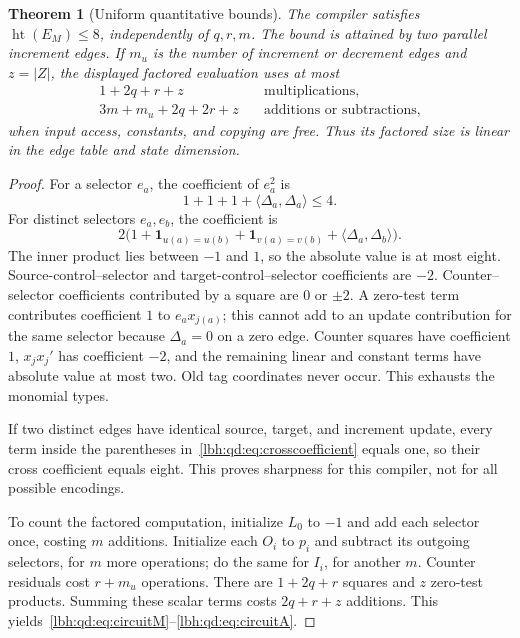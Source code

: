 \documentclass[11pt,letterpaper]{article}
\newtheorem{theorem}{Theorem}[section]
\theoremstyle{definition}
\theoremstyle{remark}
\newcommand{\one}{\mathbf 1}
\DeclareMathOperator{\htp}{ht}%
\newcommand{\1}{\mathbf 1}
\begin{document}
\begin{theorem}[Uniform quantitative bounds]\label{lbh:qd:thm:height}
The compiler satisfies $\htp(E_M)\leq8$, independently of $q,r,m$. The bound
is attained by two parallel increment edges. If $m_u$ is the number of
increment or decrement edges and $z=|Z|$, the displayed factored evaluation
uses at most
\begin{align}
 1+2q+r+z&\quad\text{multiplications},\label{lbh:qd:eq:circuitM}\\
 3m+m_u+2q+2r+z&\quad\text{additions or subtractions},\label{lbh:qd:eq:circuitA}
\end{align}
when input access, constants, and copying are free. Thus its factored size
is linear in the edge table and state dimension.
\end{theorem}

\begin{proof}
For a selector $e_a$, the coefficient of $e_a^2$ is
\[
 1+1+1+\langle\Delta_a,\Delta_a\rangle\leq4.
\]
For distinct selectors $e_a,e_b$, the coefficient is
\begin{equation}\label{lbh:qd:eq:crosscoefficient}
 2\bigl(1+\one_{u(a)=u(b)}+\one_{v(a)=v(b)}
                       +\langle\Delta_a,\Delta_b\rangle\bigr).
\end{equation}
The inner product lies between $-1$ and $1$, so the absolute value is at most
eight. Source-control--selector and target-control--selector coefficients
are $-2$. Counter--selector coefficients contributed by a square are $0$ or
$\pm2$. A zero-test term contributes coefficient $1$ to $e_a x_{j(a)}$;
this cannot add to an update contribution for the same selector because
$\Delta_a=0$ on a zero edge. Counter squares have coefficient $1$,
$x_jx_j'$ has coefficient $-2$, and the remaining linear and constant terms
have absolute value at most two. Old tag coordinates never occur. This
exhausts the monomial types.

If two distinct edges have identical source, target, and increment update,
every term inside the parentheses in~\eqref{lbh:qd:eq:crosscoefficient} equals one,
so their cross coefficient equals eight. This proves sharpness for this
compiler, not for all possible encodings.

To count the factored computation, initialize $L_0$ to $-1$ and add each
selector once, costing $m$ additions. Initialize each $O_i$ to $p_i$ and
subtract its outgoing selectors, for $m$ more operations; do the same for
$I_i$, for another $m$. Counter residuals cost $r+m_u$ operations. There
are $1+2q+r$ squares and $z$ zero-test products. Summing these scalar terms
costs $2q+r+z$ additions. This yields~\eqref{lbh:qd:eq:circuitM}--\eqref{lbh:qd:eq:circuitA}.
\end{proof}
\end{document}
